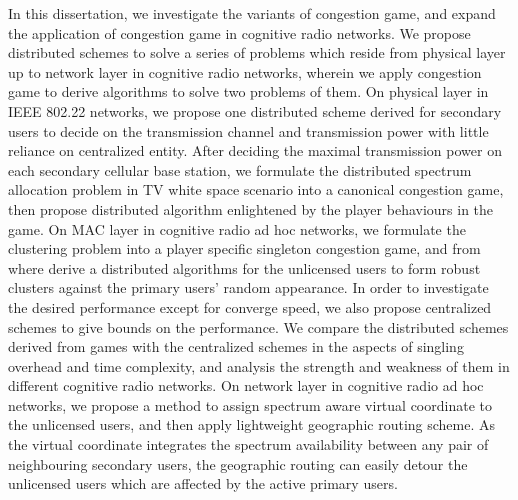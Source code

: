 In this dissertation, we investigate the variants of congestion game, and expand the application of congestion game in cognitive radio networks.
We propose distributed schemes to solve a series of problems which reside from physical layer up to network layer in cognitive radio networks, wherein we apply congestion game to derive algorithms to solve two problems of them.
%
On physical layer in IEEE 802.22 networks, we propose one distributed scheme derived for secondary users to decide on the transmission channel and transmission power with little reliance on centralized entity.
After deciding the maximal transmission power on each secondary cellular base station, we formulate the distributed spectrum allocation problem in TV white space scenario into a canonical congestion game, then propose distributed algorithm enlightened by the player behaviours in the game.
%
On MAC layer in cognitive radio ad hoc networks, we formulate the clustering problem into a player specific singleton congestion game, and from where derive a distributed algorithms for the unlicensed users to form robust clusters against the primary users' random appearance.
In order to investigate the desired performance except for converge speed, we also propose centralized schemes to give bounds on the performance.
We compare the distributed schemes derived from games with the centralized schemes in the aspects of singling overhead and time complexity, and analysis the strength and weakness of them in different cognitive radio networks.
%
On network layer in cognitive radio ad hoc networks, we propose a method to assign spectrum aware virtual coordinate to the unlicensed users, and then apply lightweight geographic routing scheme.
As the virtual coordinate integrates the spectrum availability between any pair of neighbouring secondary users, the geographic routing can easily detour the unlicensed users which are affected by the active primary users.
%


